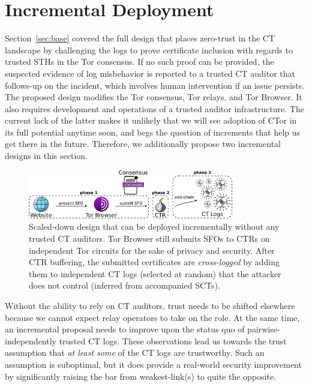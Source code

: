 \section{Incremental Deployment} \label{sec:incremental} 

Section~\ref{sec:base} covered the full design that places zero-trust in the CT
landscape by challenging the logs to prove certificate inclusion with regards to
trusted STHs in the Tor consensus.  If no such proof can be provided, the
suspected evidence of log misbehavior is reported to a trusted CT auditor that
follows-up on the incident, which involves human intervention if an issue
persists.  The proposed design modifies the Tor consensus, Tor relays, and Tor
Browser.  It also requires development and operations of a trusted auditor
infrastructure.  The current lack of the latter makes it unlikely that we will
see adoption of CTor in its full potential anytime soon, and begs the question
of increments that help us get there in the future. Therefore, we additionally
propose two incremental designs in this section.

\begin{figure}
    \centering
	\includegraphics[width=0.8\textwidth]{img/design-ca}
	\vspace{-8px}
	\caption{%
		Scaled-down design that can be deployed incrementally without any
		trusted CT auditors.  Tor Browser still submits SFOs to CTRs on
		independent Tor circuits for the sake of privacy and security.  After
		CTR buffering, the submitted certificates are \emph{cross-logged} by
		adding them to independent CT logs (selected at random) that the
		attacker does not control (inferred from accompanied SCTs).
	}
	\label{fig:cross-log}
	\vspace{-10px}
\end{figure}

Without the ability to rely on CT auditors, trust needs to be shifted elsewhere
because we cannot expect relay operators to take on the role.  At the same time,
an incremental proposal needs to improve upon the status quo of
pairwise-independently trusted CT logs. These observations lead us towards the
trust assumption that \emph{at least some} of the CT logs are trustworthy. Such
an assumption is suboptimal, but it does provide a real-world security
improvement by significantly raising the bar from weakest-link(s) to quite the
opposite.

